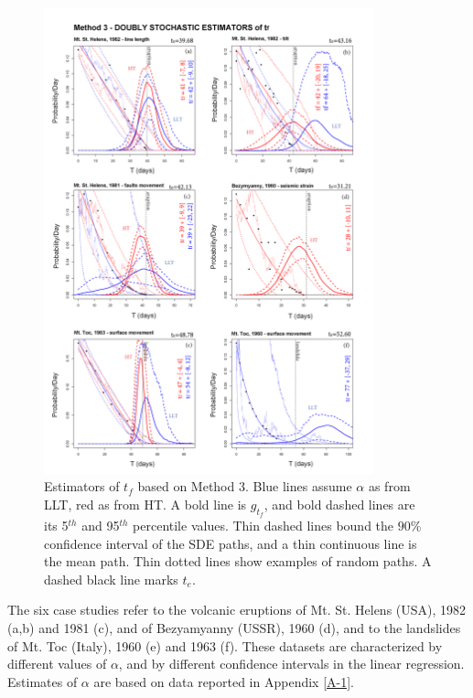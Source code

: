 \documentclass{article}
\begin{document}
\begin{figure}[H]\vskip-0.5cm
\centering
\includegraphics[width=0.85\textwidth]{Fig7_plus.png}
\caption{Estimators of $t_f$ based on Method 3. Blue lines assume $\alpha$ as from LLT, red as from HT. A bold line is $g_{t_f}$, and bold dashed lines are its 5$^{th}$ and 95$^{th}$ percentile values. Thin dashed lines bound the $90\%$ confidence interval of the SDE paths, and a thin continuous line is the mean path. Thin dotted lines show examples of random paths. A dashed black line marks $t_e$.}
\label{Fig7}
\end{figure}

The six case studies refer to the volcanic eruptions of Mt. St. Helens (USA), 1982 (a,b) and 1981 (c), and of Bezyamyanny (USSR), 1960 (d), and to the landslides of Mt. Toc (Italy), 1960 (e) and 1963 (f). These datasets are characterized by different values of $\alpha$, and by different confidence intervals in the linear regression. Estimates of $\alpha$ are based on data reported in Appendix \ref{A-1}.
\end{document}
